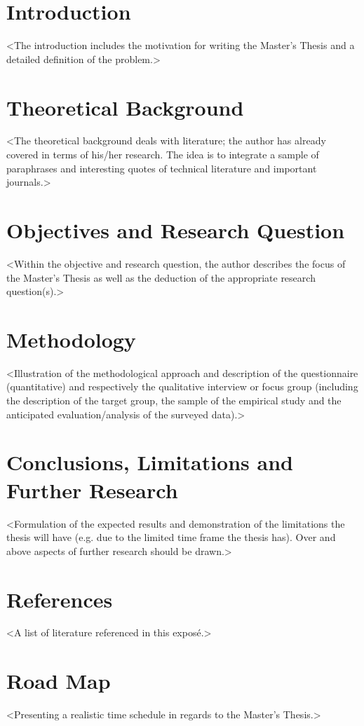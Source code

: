 \section{Introduction}

<The introduction includes the motivation for writing the Master's Thesis and a detailed definition of the problem.>

\section{Theoretical Background}
<The theoretical background deals with literature; the author has already covered in terms of his/her research. The idea is to integrate a sample of paraphrases and interesting quotes of technical literature and important journals.>

\section{Objectives and Research Question}
<Within the objective and research question, the author describes the focus of the Master's Thesis as well as the deduction of the appropriate research question(s).>

\section{Methodology}
<Illustration of the methodological approach and description of the questionnaire (quantitative) and respectively the qualitative interview or focus group (including the description of the target group, the sample of the empirical study and the anticipated evaluation/analysis of the surveyed data).>

\section{Conclusions, Limitations and Further Research}
<Formulation of the expected results and demonstration of the limitations the thesis will have (e.g. due to the limited time frame the thesis has). Over and above aspects of further research should be drawn.>

\section{References}
<A list of literature referenced in this exposé.>


\section{Road Map}
<Presenting a realistic time schedule in regards to the Master's Thesis.>